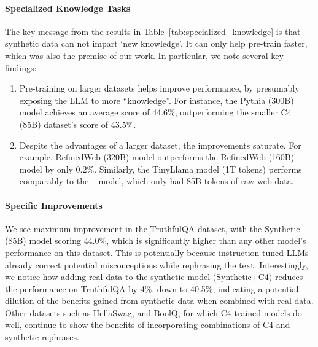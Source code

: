 \paragraph{Specialized Knowledge Tasks} 
The key message from the results
in Table~\ref{tab:specialized_knowledge} is that synthetic data can not impart `new knowledge'. It can only help pre-train faster, which was also the premise of our work. In particular, we note several key findings:
\begin{enumerate}
    \item Pre-training on larger datasets helps improve performance, by presumably exposing the LLM to more ``knowledge''. For instance, the Pythia (300B) model achieves an average score of 44.6\%, outperforming the smaller C4 (85B) dataset's score of 43.5\%.
    \item Despite the advantages of a larger dataset, the improvements saturate. For example, RefinedWeb (320B) model outperforms the RefinedWeb (160B) model by only 0.2\%. Similarly, the TinyLlama model (1T tokens) performs comparably to the \ours~ model, which only had 85B tokens of raw web data.
\end{enumerate}

\paragraph{Specific Improvements} 
We see maximum improvement in the TruthfulQA dataset, with the Synthetic (85B) model scoring 44.0\%, which is significantly higher than any other model's performance on this dataset. This is potentially because instruction-tuned LLMs already correct potential misconceptions while rephrasing the text. Interestingly, we notice how adding real data to the synthetic model (Synthetic+C4) reduces the performance on TruthfulQA by 4\%, down to 40.5\%, indicating a potential dilution of the benefits gained from synthetic data when combined with real data. Other datasets such as HellaSwag, and BoolQ, for which C4 trained models do well, continue to show the benefits of incorporating combinations of C4 and synthetic rephrases.

